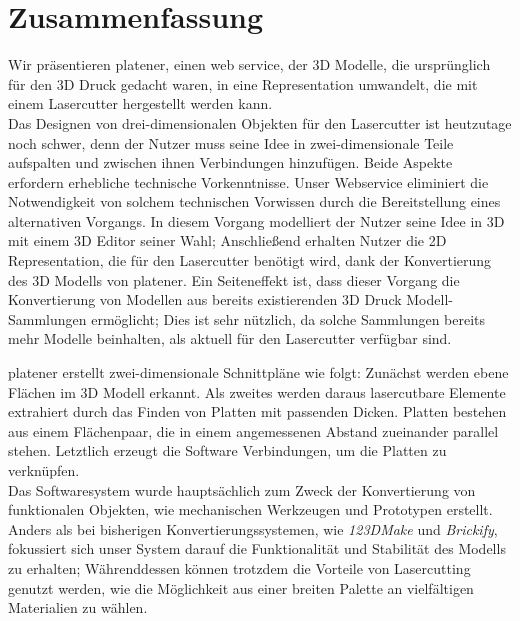 \pagebreak


\chapter*{Zusammenfassung}

Wir präsentieren platener, einen web service, der 3D Modelle, die ursprünglich für den 3D Druck gedacht waren, in eine Representation umwandelt, die mit einem Lasercutter hergestellt werden kann.\\
Das Designen von drei-dimensionalen Objekten für den Lasercutter ist heutzutage noch schwer, denn der Nutzer muss seine Idee in zwei-dimensionale Teile aufspalten und zwischen ihnen Verbindungen hinzufügen. Beide Aspekte erfordern erhebliche technische Vorkenntnisse. Unser Webservice eliminiert die Notwendigkeit von solchem technischen Vorwissen durch die Bereitstellung eines alternativen Vorgangs. In diesem Vorgang modelliert der Nutzer seine Idee in 3D mit einem 3D Editor seiner Wahl; Anschließend erhalten Nutzer die 2D Representation, die für den Lasercutter benötigt wird, dank der Konvertierung des 3D Modells von platener. Ein Seiteneffekt ist, dass dieser Vorgang die Konvertierung von Modellen aus bereits existierenden 3D Druck Modell-Sammlungen ermöglicht; Dies ist sehr nützlich, da solche Sammlungen bereits mehr Modelle beinhalten, als aktuell für den Lasercutter verfügbar sind.

\bigskip
platener erstellt zwei-dimensionale Schnittpläne wie folgt: Zunächst werden ebene Flächen im 3D Modell erkannt. Als zweites werden daraus lasercutbare Elemente extrahiert durch das Finden von Platten mit passenden Dicken. Platten bestehen aus einem Flächenpaar, die in einem angemessenen Abstand zueinander parallel stehen. Letztlich erzeugt die Software Verbindungen, um die Platten zu verknüpfen.\\
Das Softwaresystem wurde hauptsächlich zum Zweck der Konvertierung von funktionalen Objekten, wie mechanischen Werkzeugen und Prototypen erstellt. Anders als bei bisherigen Konvertierungssystemen, wie \emph{123DMake} und \emph{Brickify}, fokussiert sich unser System darauf die Funktionalität und Stabilität des Modells zu erhalten; Währenddessen können trotzdem die Vorteile von Lasercutting genutzt werden, wie die Möglichkeit aus einer breiten Palette an vielfältigen Materialien zu wählen.



\endgroup			

\vfill
